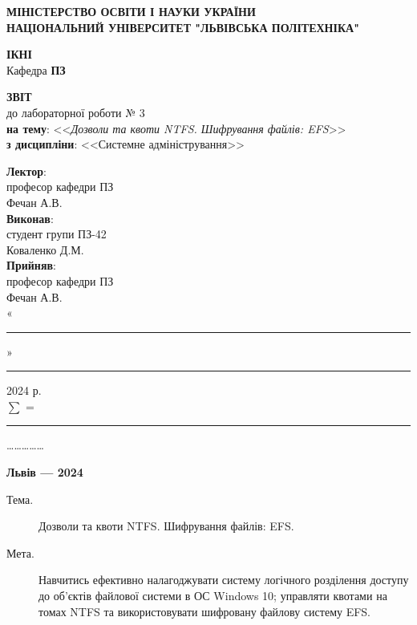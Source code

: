 \documentclass[oneside,14pt]{extarticle}
\newcommand\subject{Системне адміністрування}
\newcommand\lecturer{професор кафедри ПЗ\\Фечан А.В.}
\newcommand\teacher{професор кафедри ПЗ\\Фечан А.В.}
\newcommand\mygroup{ПЗ-42}
\newcommand\lab{3}
\newcommand\theme{Дозволи та квоти NTFS. Шифрування файлів: EFS}
\newcommand\purpose{Навчитись ефективно налагоджувати систему логічного
	розділення доступу до об’єктів файлової системи в ОС Windows 10; управляти
	квотами на томах NTFS та використовувати шифровану файлову систему EFS}
\begin{document}
\begin{normalsize}
	\begin{titlepage}
		\thispagestyle{empty}
		\begin{center}
			\textbf{МІНІСТЕРСТВО ОСВІТИ І НАУКИ УКРАЇНИ\\
				НАЦІОНАЛЬНИЙ УНІВЕРСИТЕТ "ЛЬВІВСЬКА ПОЛІТЕХНІКА"}
		\end{center}
		\begin{flushright}
			\textbf{ІКНІ}\\
			Кафедра \textbf{ПЗ}
		\end{flushright}
		\vspace{80pt}
		\begin{center}
			\textbf{ЗВІТ}\\
			\vspace{10pt}
			до лабораторної роботи № \lab\\
			\textbf{на тему}: <<\textit{\theme}>>\\
			\textbf{з дисципліни}: <<\subject>>
		\end{center}
		\vspace{80pt}
		\begin{flushright}
			
			\textbf{Лектор}:\\
			\lecturer\\
			\vspace{28pt}
			\textbf{Виконав}:\\
			
			студент групи \mygroup\\
			Коваленко Д.М.\\
			\vspace{28pt}
			\textbf{Прийняв}:\\
			
			\teacher\\
			
			\vspace{28pt}
			«\rule{1cm}{0.15mm}» \rule{1.5cm}{0.15mm} 2024 р.\\
			$\sum$ = \rule{1cm}{0.15mm}……………\\
			
		\end{flushright}
		\vspace{\fill}
		\begin{center}
			\textbf{Львів — 2024}
		\end{center}
	\end{titlepage}
		
	\begin{description}
		\item[Тема.] \theme.
		\item[Мета.] \purpose.
	\end{description}


\end{normalsize}
\end{document}
